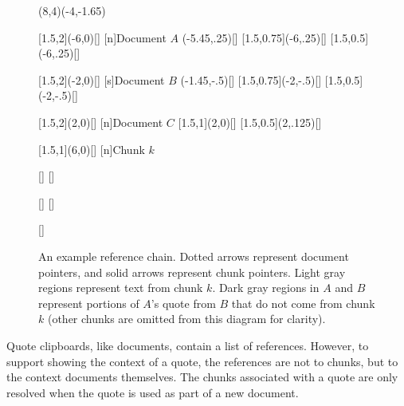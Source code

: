 \documentclass{acm_proc_article-sp}
\begin{document}
\begin{figure*}[t]
\begin{center}

\begin{graph}(8,4)(-4,-1.65)
\opaquetextfalse

[1.5,2](-6,0)[\fillednodesfalse]     
[n]{Document $A$}
(-5.45,.25)[]
[1.5,0.75](-6,.25)[]  
[1.5,0.5](-6,.25)[]


[1.5,2](-2,0)[\fillednodesfalse]
[s]{Document $B$}
(-1.45,-.5)[]
[1.5,0.75](-2,-.5)[]
[1.5,0.5](-2,-.5)[]



[1.5,2](2,0)[\fillednodesfalse]      
[n]{Document $C$}
[1.5,1](2,0)[]
[1.5,0.5](2,.125)[]


[1.5,1](6,0)[]      
[n]{Chunk $k$}


[]
[]

[]
[]

[]


\end{graph}

\caption{An example reference chain.  Dotted arrows represent document pointers, and solid arrows represent chunk pointers.  Light gray regions represent text from chunk $k$.  Dark gray regions in $A$ and $B$ represent portions of $A$'s quote from $B$ that do not come from chunk $k$ (other chunks are omitted from this diagram for clarity).}
\label{fig:referenceChain}

\end{center}

\end{figure*}





Quote clipboards, like documents, contain a list of references.
However, to support showing the context of a quote, the references are not to chunks, but to the context documents themselves.
The chunks associated with a quote are only resolved when the quote is used as part of a new document.
\end{document}
